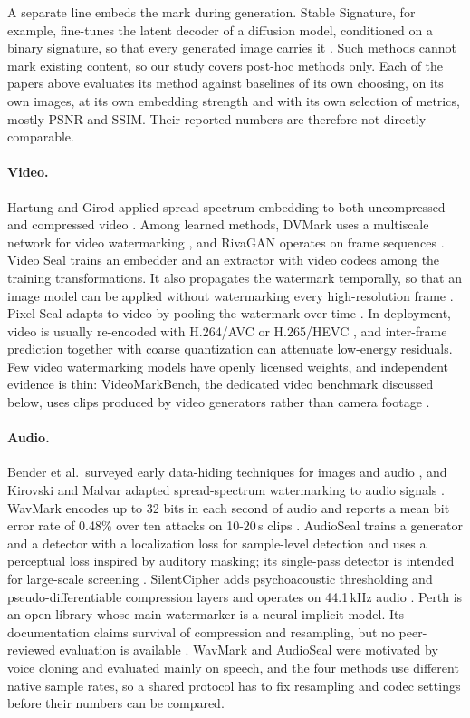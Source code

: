 A separate line embeds the mark during generation. Stable Signature, for example, fine-tunes the latent decoder of a diffusion model, conditioned on a binary signature, so that every generated image carries it \cite{fernandez2023stable}. Such methods cannot mark existing content, so our study covers post-hoc methods only. Each of the papers above evaluates its method against baselines of its own choosing, on its own images, at its own embedding strength and with its own selection of metrics, mostly PSNR and SSIM. Their reported numbers are therefore not directly comparable.

\paragraph{Video.} Hartung and Girod applied spread-spectrum embedding to both uncompressed and compressed video \cite{hartung1998video}. Among learned methods, DVMark uses a multiscale network for video watermarking \cite{luo2025dvmark}, and RivaGAN operates on frame sequences \cite{zhang2019rivagan}. Video Seal trains an embedder and an extractor with video codecs among the training transformations. It also propagates the watermark temporally, so that an image model can be applied without watermarking every high-resolution frame \cite{fernandez2024videoseal}. Pixel Seal adapts to video by pooling the watermark over time \cite{soucek2025pixelseal}. In deployment, video is usually re-encoded with H.264/AVC \cite{wiegand2003h264} or H.265/HEVC \cite{sullivan2012hevc}, and inter-frame prediction together with coarse quantization can attenuate low-energy residuals. Few video watermarking models have openly licensed weights, and independent evidence is thin: VideoMarkBench, the dedicated video benchmark discussed below, uses clips produced by video generators rather than camera footage \cite{jiang2025videomarkbench}.

\paragraph{Audio.} Bender et al.\ surveyed early data-hiding techniques for images and audio \cite{bender1996techniques}, and Kirovski and Malvar adapted spread-spectrum watermarking to audio signals \cite{kirovski2003spread}. WavMark encodes up to 32 bits in each second of audio and reports a mean bit error rate of 0.48\% over ten attacks on 10-20\,s clips \cite{chen2023wavmark}. AudioSeal trains a generator and a detector with a localization loss for sample-level detection and uses a perceptual loss inspired by auditory masking; its single-pass detector is intended for large-scale screening \cite{sanroman2024audioseal}. SilentCipher adds psychoacoustic thresholding and pseudo-differentiable compression layers and operates on 44.1\,kHz audio \cite{singh2024silentcipher}. Perth is an open library whose main watermarker is a neural implicit model. Its documentation claims survival of compression and resampling, but no peer-reviewed evaluation is available \cite{perth2025}. WavMark and AudioSeal were motivated by voice cloning and evaluated mainly on speech, and the four methods use different native sample rates, so a shared protocol has to fix resampling and codec settings before their numbers can be compared.

